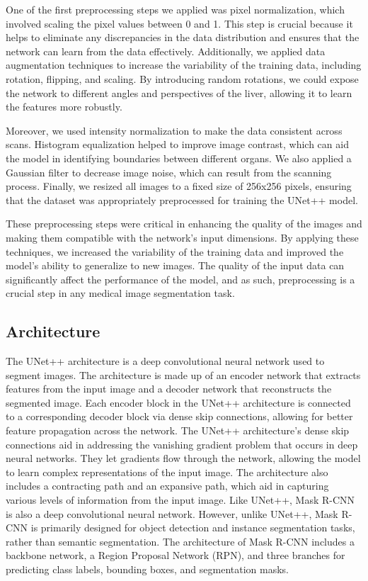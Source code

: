 \documentclass[conference]{IEEEtran}
\begin{document}
One of the first preprocessing steps we applied was pixel normalization, which involved scaling the pixel values between 0 and 1. This step is crucial because it helps to eliminate any discrepancies in the data distribution and ensures that the network can learn from the data effectively. Additionally, we applied data augmentation techniques to increase the variability of the training data, including rotation, flipping, and scaling. By introducing random rotations, we could expose the network to different angles and perspectives of the liver, allowing it to learn the features more robustly.

Moreover, we used intensity normalization to make the data consistent across scans. Histogram equalization helped to improve image contrast, which can aid the model in identifying boundaries between different organs. We also applied a Gaussian filter to decrease image noise, which can result from the scanning process. Finally, we resized all images to a fixed size of 256x256 pixels, ensuring that the dataset was appropriately preprocessed for training the UNet++ model.

These preprocessing steps were critical in enhancing the quality of the images and making them compatible with the network’s input dimensions. By applying these techniques, we increased the variability of the training data and improved the model’s ability to generalize to new images. The quality of the input data can significantly affect the performance of the model, and as such, preprocessing is a crucial step in any medical image segmentation task.

\subsection{ Architecture}\label{SCM}
The UNet++ architecture is a deep convolutional neural network used to segment images. The architecture is made up of an encoder network that extracts features from the input image and a decoder network that reconstructs the segmented image. Each encoder block in the UNet++ architecture is connected to a corresponding decoder block via dense skip connections, allowing for better feature propagation across the network.
The UNet++ architecture's dense skip connections aid in addressing the vanishing gradient problem that occurs in deep neural networks. They let gradients flow through the network, allowing the model to learn complex representations of the input image. The architecture also includes a contracting path and an expansive path, which aid in capturing various levels of information from the input image.
Like UNet++, Mask R-CNN is also a deep convolutional neural network. However, unlike UNet++, Mask R-CNN is primarily designed for object detection and instance segmentation tasks, rather than semantic segmentation. The architecture of Mask R-CNN includes a backbone network, a Region Proposal Network (RPN), and three branches for predicting class labels, bounding boxes, and segmentation masks.
\end{document}
